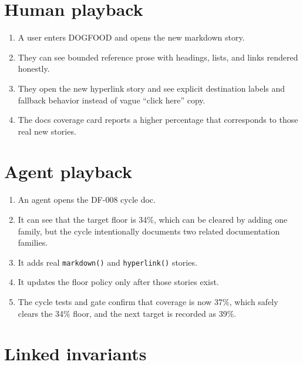 \section{Human playback}\label{record-070-human-playback}

\begin{enumerate}
\def\labelenumi{\arabic{enumi}.}
\tightlist
\item
  A user enters DOGFOOD and opens the new markdown story.
\item
  They can see bounded reference prose with headings, lists, and links rendered honestly.
\item
  They open the new hyperlink story and see explicit destination labels and fallback behavior instead of vague ``click here'' copy.
\item
  The docs coverage card reports a higher percentage that corresponds to those real new stories.
\end{enumerate}

\section{Agent playback}\label{record-070-agent-playback}

\begin{enumerate}
\def\labelenumi{\arabic{enumi}.}
\tightlist
\item
  An agent opens the DF-008 cycle doc.
\item
  It can see that the target floor is 34\%, which can be cleared by adding one family, but the cycle intentionally documents two related documentation families.
\item
  It adds real \texttt{m\allowbreak{}a\allowbreak{}r\allowbreak{}k\allowbreak{}d\allowbreak{}o\allowbreak{}w\allowbreak{}n\allowbreak{}(\allowbreak{})} and \texttt{h\allowbreak{}y\allowbreak{}p\allowbreak{}e\allowbreak{}r\allowbreak{}l\allowbreak{}i\allowbreak{}n\allowbreak{}k\allowbreak{}(\allowbreak{})} stories.
\item
  It updates the floor policy only after those stories exist.
\item
  The cycle tests and gate confirm that coverage is now 37\%, which safely clears the 34\% floor, and the next target is recorded as 39\%.
\end{enumerate}

\section{Linked invariants}\label{record-070-linked-invariants}

